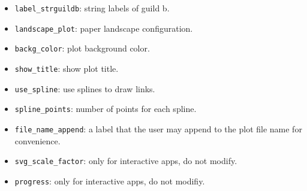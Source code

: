 \documentclass[12pt]{article}
\begin{document}
\begin{itemize}
\item \texttt{label\_strguildb}: string labels of guild b.

\item \texttt{landscape\_plot}: paper landscape configuration.

\item \texttt{backg\_color}: plot background color.

\item \texttt{show\_title}: show plot title.

\item \texttt{use\_spline}: use splines to draw links.

\item \texttt{spline\_points}: number of points for each spline.

\item \texttt{file\_name\_append}: a label that the user may append to the plot file name for convenience.

\item \texttt{svg\_scale\_factor}: only for interactive apps, do not modify.

\item \texttt{progress}: only for interactive apps, do not modifiy.
\end{itemize}


\normalsize

\clearpage
\printbibliography[heading=bibintoc]
\end{document}
